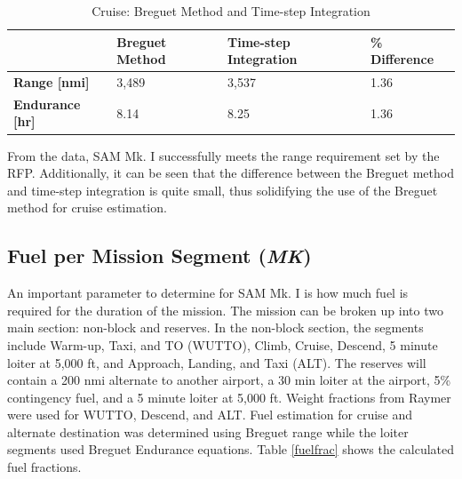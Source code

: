 \begin{table}[!h]
    \centering
    \caption{Cruise: Breguet Method and Time-step Integration}
    \begin{tabular}{|p{1in}|p{1in}|p{1.5in}|p{1in}|}\toprule 
     & \textbf{Breguet Method} & \textbf{Time-step Integration} & \textbf{\% Difference} \\ \hline 
    \textbf{Range [nmi]} & 3,489 & 3,537 & 1.36 \\ \hline
    \textbf{Endurance [hr]} & 8.14 & 8.25 & 1.36 \\ 
    \bottomrule
    \end{tabular}
    \label{tab:cruise}
\end{table}

From the data, SAM Mk. I successfully meets the range requirement set by the RFP. Additionally, it can be seen that the difference between the Breguet method and time-step integration is quite small, thus solidifying the use of the Breguet method for cruise estimation. 

\subsection{Fuel per Mission Segment (\textit{MK})}
An important parameter to determine for SAM Mk. I is how much fuel is required for the duration of the mission. The mission can be broken up into two main section: non-block and reserves. In the non-block section, the segments include Warm-up, Taxi, and TO (WUTTO), Climb, Cruise, Descend, 5 minute loiter at 5,000 ft, and Approach, Landing, and Taxi (ALT). The reserves will contain a 200 nmi alternate to another airport, a 30 min loiter at the airport, 5\% contingency fuel, and a 5 minute loiter at 5,000 ft. Weight fractions from Raymer\cite{raymer} were used for WUTTO, Descend, and ALT. Fuel estimation for cruise and alternate destination was determined using Breguet range while the loiter segments used Breguet Endurance equations. Table \ref{fuelfrac} shows the calculated fuel fractions. 


